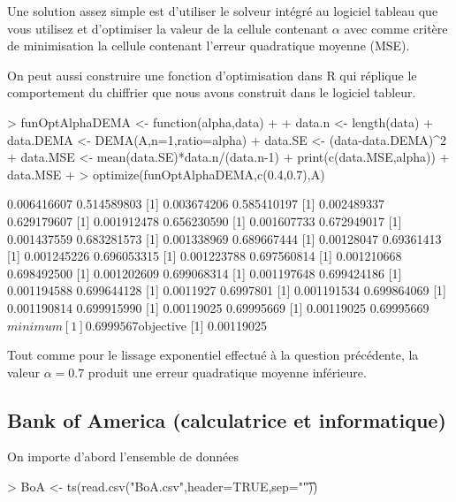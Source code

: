 \documentclass{article}
\begin{document}
Une solution assez simple est d'utiliser le solveur intégré au logiciel tableau que vous utilisez et d'optimiser la valeur de la cellule contenant $\alpha$ avec comme critère de minimisation la cellule contenant l'erreur quadratique moyenne (MSE).

On peut aussi construire une fonction d'optimisation dans R qui réplique le comportement du chiffrier que nous avons construit dans le logiciel tableur.

\begin{Schunk}
\begin{Sinput}
> funOptAlphaDEMA <- function(alpha,data)
+   {
+     data.n <- length(data)
+     data.DEMA <- DEMA(A,n=1,ratio=alpha)
+     data.SE <- (data-data.DEMA)^2
+     data.MSE <- mean(data.SE)*data.n/(data.n-1)
+     print(c(data.MSE,alpha))
+     data.MSE
+   }
> optimize(funOptAlphaDEMA,c(0.4,0.7),A)
\end{Sinput}
\begin{Soutput}
[1] 0.006416607 0.514589803
[1] 0.003674206 0.585410197
[1] 0.002489337 0.629179607
[1] 0.001912478 0.656230590
[1] 0.001607733 0.672949017
[1] 0.001437559 0.683281573
[1] 0.001338969 0.689667444
[1] 0.00128047 0.69361413
[1] 0.001245226 0.696053315
[1] 0.001223788 0.697560814
[1] 0.001210668 0.698492500
[1] 0.001202609 0.699068314
[1] 0.001197648 0.699424186
[1] 0.001194588 0.699644128
[1] 0.0011927 0.6997801
[1] 0.001191534 0.699864069
[1] 0.001190814 0.699915990
[1] 0.00119025 0.69995669
[1] 0.00119025 0.69995669
$minimum
[1] 0.6999567

$objective
[1] 0.00119025
\end{Soutput}
\end{Schunk}

Tout comme pour le lissage exponentiel effectué à la question précédente, la valeur $\alpha=0.7$ produit une erreur quadratique moyenne inférieure.

\subsection{Bank of America (calculatrice et informatique)}

On importe d'abord l'ensemble de données
\begin{Schunk}
\begin{Sinput}
> BoA <- ts(read.csv("BoA.csv",header=TRUE,sep="\t"))
\end{Sinput}
\end{Schunk}
\end{document}
